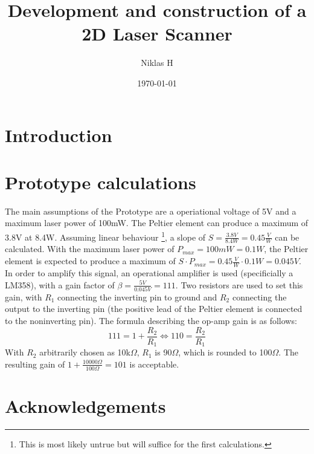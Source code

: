 \documentclass[a4paper, 11pt]{scrartcl}
\title {Development and construction of a 2D Laser Scanner}
\author {Niklas H}
\date {\today}
\begin{document}
\maketitle
\tableofcontents
\newpage
\section{Introduction}

\section{Prototype calculations}
The main assumptions of the Prototype are a operiational voltage of 5V and a maximum laser power of 100mW. The Peltier element can produce a maximum of 3.8V at 8.4W. Assuming linear behaviour \footnote{This is most likely untrue but will suffice for the first calculations.}, a slope of $S = \frac{3.8V}{8.4W}=0.45\frac{V}{W}$ can be calculated. With the maximum laser power of $P_{max}=100mW=0.1W$, the Peltier element is expected to produce a maximum of $S\cdot P_{max} = 0.45\frac{V}{W}\cdot 0.1W = 0.045V$. In order to amplify this signal, an operational amplifier is used (specificially a LM358), with a gain factor of $\beta = \frac{5V}{0.045V} = 111$. Two resistors are used to set this gain, with $R_1$ connecting the inverting pin to ground and $R_2$ connecting the output to the inverting pin (the positive lead of the Peltier element is connected to the noninverting pin). The formula describing the op-amp gain is as follows:
\begin{equation}
111 = 1 + \frac{R_2}{R_1} \Leftrightarrow
110 = \frac{R_2}{R_1}
\end{equation}
With $R_2$ arbitrarily chosen as 10k$\Omega$, $R_1$ is 90$\Omega$, which is rounded to 100$\Omega$. The resulting gain of $1+\frac{10000\Omega}{100\Omega}=101$ is acceptable. \\
\section{Acknowledgements}


%
\end{document}
